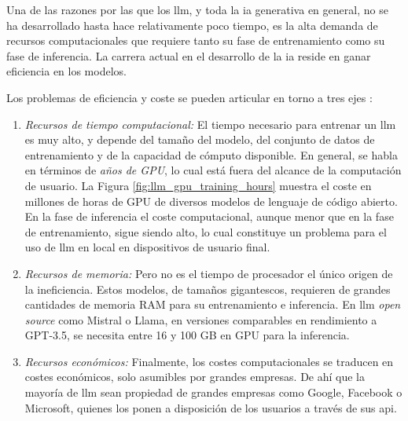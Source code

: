 Una de las razones por las que los \gls{llm}, y toda la \gls{ia} generativa en general, no se ha desarrollado hasta hace relativamente poco tiempo, es la alta demanda de recursos computacionales que requiere tanto su fase de entrenamiento como su fase de inferencia. La carrera actual en el desarrollo de la \gls{ia} reside en ganar eficiencia en los modelos. 

Los problemas de eficiencia y coste se pueden articular en torno a tres ejes \citep{arunbijiRAGVsFinetuning}:

\begin{enumerate}[label=\alph*)]
    \item \textit{Recursos de tiempo computacional:} El tiempo necesario para entrenar un \gls{llm} es muy alto, y depende del tamaño del modelo, del conjunto de datos de entrenamiento y de la capacidad de cómputo disponible. En general, se habla en términos de \emph{años de GPU}, lo cual está fuera del alcance de la computación de usuario. La Figura \ref{fig:llm_gpu_training_hours} muestra el coste en millones de horas de GPU de diversos modelos de lenguaje de código abierto. En la fase de inferencia el coste computacional, aunque menor que en la fase de entrenamiento, sigue siendo alto, lo cual constituye un problema para el uso de \gls{llm} en local en dispositivos de usuario final.
    \item \textit{Recursos de memoria:} Pero no es el tiempo de procesador el único origen de la ineficiencia. Estos modelos, de tamaños gigantescos, requieren de grandes cantidades de memoria RAM para su entrenamiento e inferencia. En \gls{llm} \emph{open source} como Mistral o Llama, en versiones comparables en rendimiento a GPT-3.5, se necesita entre 16 y 100 GB en GPU para la inferencia. 
    \item \textit{Recursos económicos:} Finalmente, los costes computacionales se traducen en costes económicos, solo asumibles por grandes empresas. De ahí que la mayoría de \gls{llm} sean propiedad de grandes empresas como Google, Facebook o Microsoft, quienes los ponen a disposición de los usuarios a través de sus \gls{api}.
\end{enumerate}

